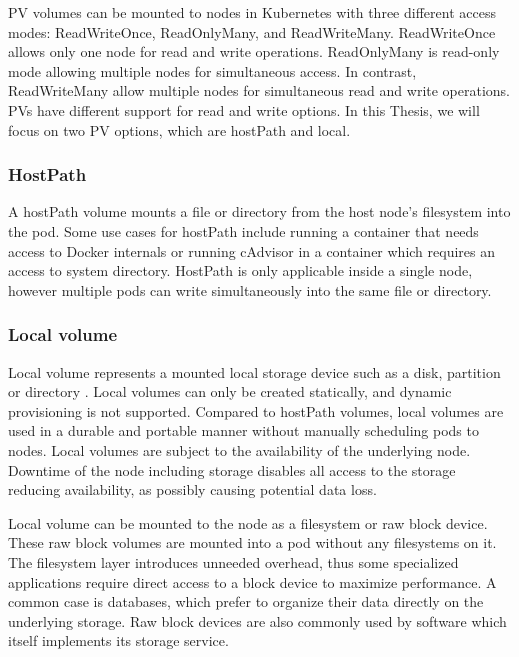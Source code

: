 PV volumes can be mounted to nodes in Kubernetes with three different access modes: ReadWriteOnce, ReadOnlyMany, and ReadWriteMany. ReadWriteOnce allows only one node for read and write operations. ReadOnlyMany is read-only mode allowing multiple nodes for simultaneous access. In contrast, ReadWriteMany allow multiple nodes for simultaneous read and write operations. PVs have different support for read and write options. In this Thesis, we will focus on two PV options, which are hostPath and local. \cite{PV} 

\subsubsection{HostPath}

A hostPath volume mounts a file or directory from the host node's filesystem into the pod. Some use cases for hostPath include running a container that needs access to Docker internals or running cAdvisor in a container which requires an access to system directory. HostPath is only applicable inside a single node, however multiple pods can write simultaneously into the same file or directory.

\subsubsection{Local volume}

Local volume represents a mounted local storage device such as a disk, partition or directory \cite{VolumesKubernetes}. Local volumes can only be created statically, and dynamic provisioning is not supported. Compared to hostPath volumes, local volumes are used in a durable and portable manner without manually scheduling pods to nodes. Local volumes are subject to the availability of the underlying node. Downtime of the node including storage disables all access to the storage reducing availability, as possibly causing potential data loss.

Local volume can be mounted to the node as a filesystem or raw block device. These raw block volumes are mounted into a pod without any filesystems on it. The filesystem layer introduces unneeded overhead, thus some specialized applications require direct access to a block device to maximize performance. A common case is databases, which prefer to organize their data directly on the underlying storage. Raw block devices are also commonly used by software which itself implements its storage service. \cite{RawBlockKubernetes}

